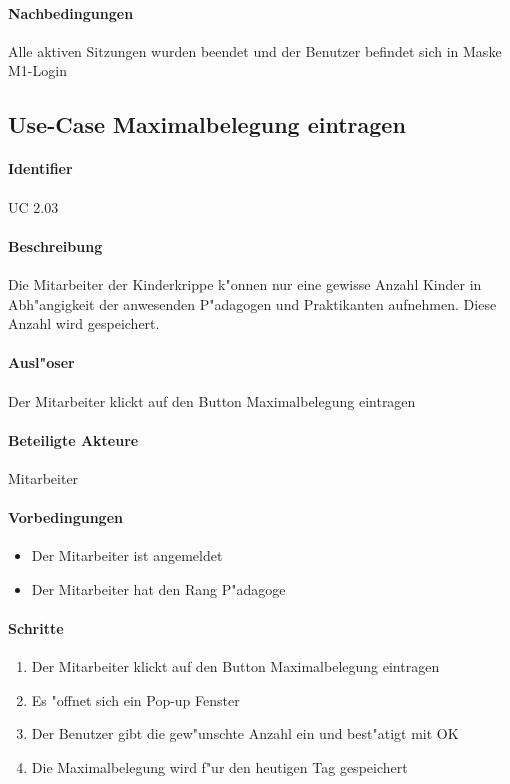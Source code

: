   \paragraph{Nachbedingungen}
  Alle aktiven Sitzungen wurden beendet und der Benutzer befindet sich in Maske M1-Login

  
 \newpage
 \subsection{Use-Case Maximalbelegung eintragen}
  \paragraph{Identifier}
  UC 2.03
  \paragraph{Beschreibung}
  Die Mitarbeiter der Kinderkrippe k"onnen nur eine gewisse Anzahl Kinder in Abh"angigkeit der anwesenden P"adagogen und Praktikanten aufnehmen. Diese Anzahl wird gespeichert.
  \paragraph{Ausl"oser}
  Der Mitarbeiter klickt auf den Button \dq Maximalbelegung eintragen\dq
  \paragraph{Beteiligte Akteure}   \leavevmode \newline
    Mitarbeiter
  \paragraph{Vorbedingungen}
  \begin{itemize}
   \item Der Mitarbeiter ist angemeldet
   \item Der Mitarbeiter hat den Rang \dq P"adagoge\dq
  \end{itemize}

  \paragraph{Schritte}
  \begin{enumerate}
   \item Der Mitarbeiter klickt auf den Button \dq Maximalbelegung eintragen\dq
   \item Es "offnet sich ein Pop-up Fenster
   \item Der Benutzer gibt die gew"unschte Anzahl ein und best"atigt mit \dq OK\dq
   \item Die Maximalbelegung wird f"ur den heutigen Tag gespeichert
  \end{enumerate}

